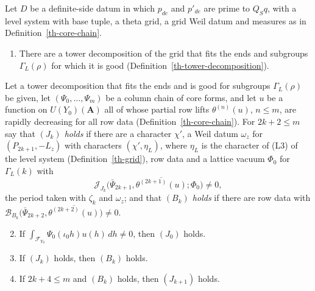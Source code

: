 \begin{lemma}\label{th-tower-rungs}
Let $D$ be a definite-side datum in which $p_{de}$ and $p'_{de}$ are prime to
$Q_Sq$, with a level system with base tuple, a theta grid, a grid Weil datum and
measures as in Definition~\ref{th-core-chain}.
\begin{enumerate}
\item There are a tower decomposition of the grid that fits the ends and
  subgroups $\Gamma_L(\rho)$ for which it is good
  (Definition~\ref{th-tower-decomposition}).
\end{enumerate}
Let a tower decomposition that fits the ends and is good for subgroups
$\Gamma_L(\rho)$ be given, let $(\Psi_0,\ldots,\Psi_m)$ be a column chain of
core forms, and let $u$ be a function on $U(Y_0)(\mathbf A)$ all of whose
partial row lifts $\theta^{(n)}(u)$, $n\leq m$, are rapidly decreasing for all
row data (Definition~\ref{th-core-chain}). For $2k+2\leq m$ say that
\emph{$(J_k)$ holds} if there are a character $\chi'$, a Weil datum $\omega_z$
for $(P_{2k+1},-L_z)$ with characters $(\chi',\eta_L)$, where $\eta_L$ is the
character of (L3) of the level system (Definition~\ref{th-grid}), row data and
a lattice vacuum $\Phi_0$ for $\Gamma_L(k)$ with
\[
\mathcal J_{J_k}\bigl(\bar\Psi_{2k+1},\overline{\theta^{(2k+1)}(u)};\Phi_0\bigr)\neq0,
\]
the period taken with $\zeta_k$ and $\omega_z$; and that \emph{$(B_k)$ holds}
if there are row data with
$\mathcal B_{B_k}\bigl(\bar\Psi_{2k+2},\overline{\theta^{(2k+2)}(u)}\bigr)\neq0$.
\begin{enumerate}\setcounter{enumi}{1}
\item If $\int_{\mathcal F_{Y_0}}\Psi_0(\iota_0h)u(h)\,dh\neq0$, then $(J_0)$
  holds.
\item If $(J_k)$ holds, then $(B_k)$ holds.
\item If $2k+4\leq m$ and $(B_k)$ holds, then $(J_{k+1})$ holds.
\end{enumerate}
\end{lemma}

